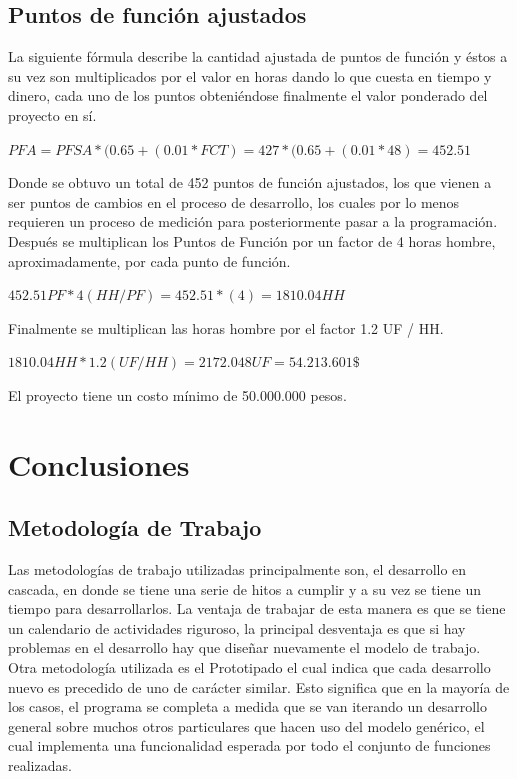 \documentclass[a4paper,12pt,openany,oneside]{book}
\begin{document}
\section{Puntos de función ajustados}
La siguiente fórmula describe la cantidad ajustada de puntos de función y éstos a su vez son multiplicados por el valor en horas dando lo que cuesta en tiempo y dinero, cada uno de los puntos obteniéndose finalmente el valor ponderado del proyecto en sí.

\begin{math}
PFA=PFSA * ( 0.65 + ( 0.01 * FCT ) = 427 * ( 0.65 + ( 0.01 * 48 ) = 452.51
\end{math}

Donde se obtuvo un total de 452 puntos de función ajustados, los que vienen a ser puntos de cambios en el proceso de desarrollo, los cuales por lo menos requieren un proceso de medición para posteriormente pasar a la programación. Después se multiplican los Puntos de Función por un factor de 4 horas hombre, aproximadamente, por cada punto de función.

\begin{math}
452.51 PF * 4 (HH / PF) = 452.51 * (4) = 1810.04 HH
\end{math}

Finalmente se multiplican las horas hombre por el factor 1.2 UF / HH.

\begin{math}
1810.04 HH * 1.2(UF / HH) = 2172.048 UF = 54.213.601 \$
\end{math}

El proyecto tiene un costo mínimo de 50.000.000 pesos.

\chapter{Conclusiones}

\section{Metodología de Trabajo}
Las metodologías de trabajo utilizadas principalmente son, el desarrollo en cascada, en donde se tiene una serie de hitos a cumplir y a su vez se tiene un tiempo para desarrollarlos. La ventaja de trabajar de esta manera es que se tiene un calendario de actividades riguroso, la principal desventaja es que si hay problemas en el desarrollo hay que diseñar nuevamente el modelo de trabajo. Otra metodología utilizada es el Prototipado el cual indica que cada desarrollo nuevo es precedido de uno de carácter similar. Esto significa que en la mayoría de los casos, el programa se completa a medida que se van iterando un desarrollo general sobre muchos otros particulares que hacen uso del modelo genérico, el cual implementa una funcionalidad esperada por todo el conjunto de funciones realizadas.
\end{document}
